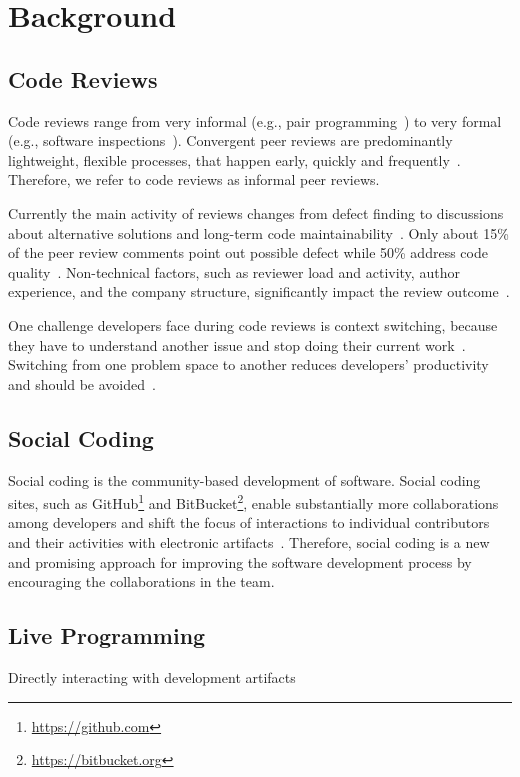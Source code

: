 
\section{Background}
\subsection{Code Reviews}
Code reviews range from very informal (e.g., pair programming~\cite{beck2000extreme}) to very formal (e.g., software inspections~\cite{fagan2001design, ackerman1989software}). 
%
Convergent peer reviews are predominantly lightweight, flexible processes, that happen early, quickly and frequently~\cite{rigby2013PeerCodeReviews, shimagaki2016CRInSony, rigby2012contemporary, rigby2014PeerReviewOSS, Sadowski2018Google}. 
%
Therefore, we refer to code reviews as informal peer reviews.
%

%
Currently the main activity of reviews changes from defect finding to discussions about alternative solutions and long-term code maintainability~\cite{rigby2013PeerCodeReviews, czerwonka2015codereviews}.
%
Only about 15\% of the peer review comments point out possible defect while 50\% address code quality~\cite{czerwonka2015codereviews}.
%
Non-technical factors, such as reviewer load and activity, author experience, and the company structure, significantly impact the review outcome~\cite{baysal2013influence, baysal2016investigating}.

%
One challenge developers face during code reviews is context switching, because they have to understand another issue and stop doing their current work~\cite{czerwonka2015codereviews, kononenko2016codereviewquality}.
%
Switching from one problem space to another reduces developers' productivity and should be avoided~\cite{poppendieck2003lean}. 

\subsection{Social Coding}
Social coding is the community-based development of software.
%
Social coding sites, such as GitHub\footnote{\url{https://github.com}} and BitBucket\footnote{\url{https://bitbucket.org}}, enable substantially more collaborations among developers \cite{thung2013github} and shift the focus of interactions to individual contributors and their activities with electronic artifacts~\cite{dabbish2012social, storey2012msr}.
%
Therefore, social coding is a new and promising approach for improving the software development process by encouraging the collaborations in the team.

\subsection{Live Programming}
Directly interacting with development artifacts